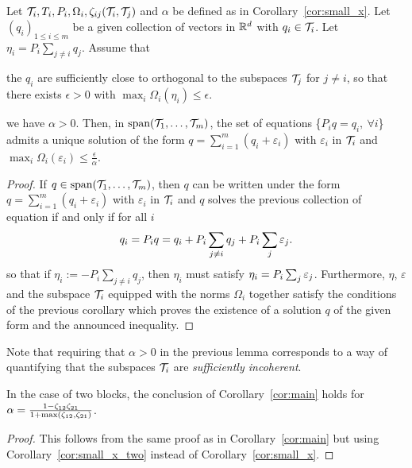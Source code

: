 \documentclass{article}
\begin{document}
\begin{cor}
\label{cor:main}
Let $\mathcal{T}_i,T_i,P_i,\Omega_i, \zeta_{ij}(\mathcal{T}_i,\mathcal{T}_j)$ and $\alpha$ be defined as in Corollary~\ref{cor:small_x}. Let $(q_i)_{1\leq i \leq m}$ be a given collection of vectors in $\mathbb{R}^d$ with $q_i \in \mathcal{T}_i$. 
Let $\eta_i=P_i \sum_{j \neq i} q_j$.
Assume that
\BIT
\item the $q_i$ are sufficiently close to orthogonal to the subspaces $\mathcal{T}_j$ for $j \neq i$, so that there exists $\epsilon>0$ with $\max_{i} \Omega_i(\eta_i) \leq \epsilon$.
\item we have $\alpha>0$.
\EIT
Then,  in $\text{span}(\mathcal{T}_1,\ldots,\mathcal{T}_m)$, the set of equations \{$P_i q=q_i, \: \forall i$\} admits a unique solution of the form $q=\sum_{i=1}^m (q_i+\varepsilon_i)$ with $\varepsilon_i$ in $\mathcal{T}_i$ and $\max_i\Omega_i(\varepsilon_i) \leq  \frac{\epsilon}{\alpha}$.
\end{cor}
\begin{proof}
If $q \in \text{span}(\mathcal{T}_1,\ldots,\mathcal{T}_m)$, then $q$ can be written under the form $q=\sum_{i=1}^m (q_i+\varepsilon_i)$ with $\varepsilon_i$ in $\mathcal{T}_i$ and $q$ solves the previous collection of equation if and only if for all $i$
$$q_i=P_i q=q_i +P_i \sum_{j \neq i} q_j+ P_i \sum_{j} \varepsilon_j.$$
so that if $\eta_i:=-P_i \sum_{j \neq i} q_j$, then $\eta_i$ must satisfy $\eta_i= P_i \sum_{j} \varepsilon_j$. Furthermore, $\eta$, $\varepsilon$ and the subspace $\mathcal{T}_i$ equipped with the norms $\Omega_i$ together satisfy the conditions of the previous corollary which proves the existence of a solution $q$ of the given form and the announced inequality.
\end{proof}

Note that requiring that $\alpha>0$ in the previous lemma corresponds to a way of quantifying that the subspaces $\mathcal{T}_i$ are \emph{sufficiently incoherent}.

\begin{cor}
\label{car:main_two}
In the case of two blocks, the conclusion of Corollary~\ref{cor:main} holds for $\alpha=\frac{1-\zeta_{12}\zeta_{21}}{1+\max(\zeta_{12},\zeta_{21})}$.
\end{cor}
\begin{proof}
This follows from the same proof as in Corollary~\ref{cor:main} but using Corollary~\ref{cor:small_x_two} instead of Corollary~\ref{cor:small_x}.
\end{proof}
\end{document}
